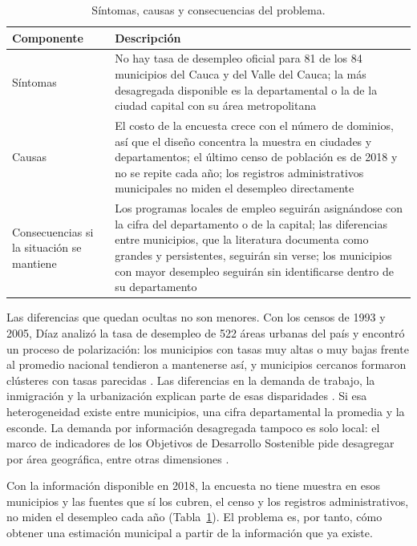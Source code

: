 \begin{table}[!htbp]
\centering
\small
\caption{Síntomas, causas y consecuencias del problema.}
\label{tab:problema}
\renewcommand{\arraystretch}{1.15}
\begin{tabularx}{\linewidth}{>{\raggedright\arraybackslash}p{2.4cm} >{\raggedright\arraybackslash}X}
\toprule
Componente & Descripción \\
\midrule
Síntomas & No hay tasa de desempleo oficial para 81 de los 84 municipios del Cauca y del Valle del Cauca; la más desagregada disponible es la departamental o la de la ciudad capital con su área metropolitana \\
Causas & El costo de la encuesta crece con el número de dominios, así que el diseño concentra la muestra en ciudades y departamentos; el último censo de población es de 2018 y no se repite cada año; los registros administrativos municipales no miden el desempleo directamente \\
Consecuencias si la situación se mantiene & Los programas locales de empleo seguirán asignándose con la cifra del departamento o de la capital; las diferencias entre municipios, que la literatura documenta como grandes y persistentes, seguirán sin verse; los municipios con mayor desempleo seguirán sin identificarse dentro de su departamento \\
\bottomrule
\end{tabularx}
\end{table}

Las diferencias que quedan ocultas no son menores. Con los censos de 1993 y 2005, Díaz analizó la tasa de desempleo de 522 áreas urbanas del país y encontró un proceso de polarización: los municipios con tasas muy altas o muy bajas frente al promedio nacional tendieron a mantenerse así, y municipios cercanos formaron clústeres con tasas parecidas \cite[pp.~124--125]{Diaz2016}. Las diferencias en la demanda de trabajo, la inmigración y la urbanización explican parte de esas disparidades \cite[p.~124]{Diaz2016}. Si esa heterogeneidad existe entre municipios, una cifra departamental la promedia y la esconde. La demanda por información desagregada tampoco es solo local: el marco de indicadores de los Objetivos de Desarrollo Sostenible pide desagregar por área geográfica, entre otras dimensiones \cite[p.~9]{Molina2019}.

Con la información disponible en 2018, la encuesta no tiene muestra en esos municipios y las fuentes que sí los cubren, el censo y los registros administrativos, no miden el desempleo cada año (Tabla~\ref{tab:problema}). El problema es, por tanto, cómo obtener una estimación municipal a partir de la información que ya existe.

